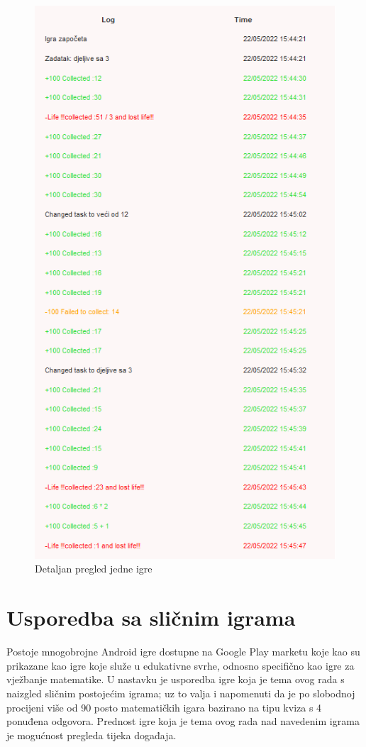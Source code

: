 \documentclass[times, utf8, zavrsni, numeric]{fer}
\begin{document}
	\begin{figure}[H]
		\includegraphics[scale = 0.9]{"slike/detaljanpregledrezultata.png"} 
		\centering
		\caption{Detaljan pregled jedne igre}
		\label{fig:pregledjedneigre}
	\end{figure}
	

\chapter{Usporedba sa sličnim igrama}
Postoje mnogobrojne Android igre dostupne na Google Play marketu koje kao su prikazane kao igre koje služe u edukativne svrhe, odnosno specifično kao igre za vježbanje matematike.  U nastavku je usporedba igre koja je tema ovog rada s naizgled 
sličnim postojećim igrama; uz to valja i napomenuti da je po slobodnoj procijeni više od 90 posto matematičkih igara bazirano na tipu kviza s 4 ponuđena odgovora. Prednost igre koja je tema ovog rada nad navedenim igrama je mogućnost pregleda tijeka događaja.
	
\end{document}
